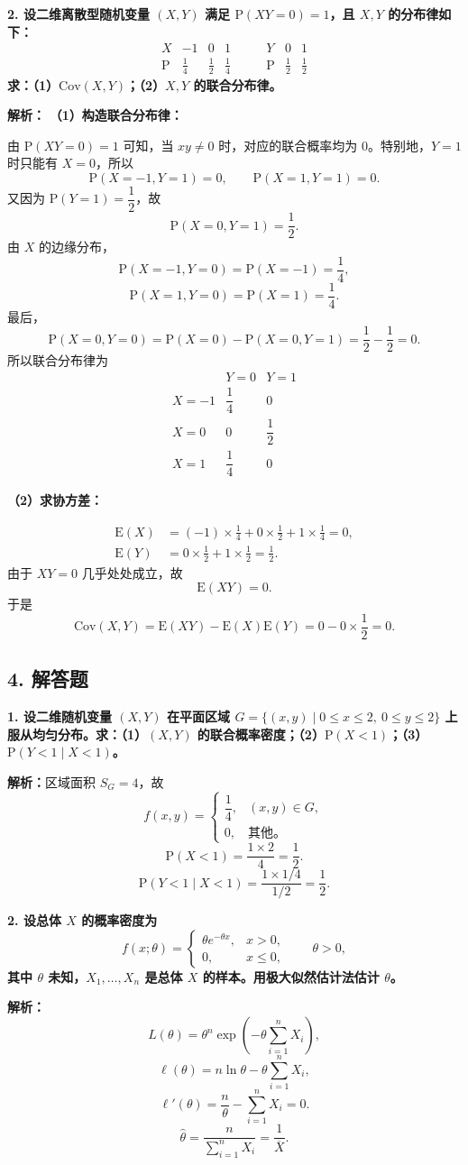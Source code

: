 ﻿\documentclass[UTF8,11pt,a4paper]{ctexart}
\newcommand{\Pp}{\mathrm{P}}
\newcommand{\E}{\mathrm{E}}
\newcommand{\Cov}{\mathrm{Cov}}
\newcommand{\Ana}[1]{\par\textbf{解析：}#1\par\medskip}
\newcommand{\Q}[1]{\par\textbf{#1}\par}
\begin{document}
\Q{2. 设二维离散型随机变量 $(X,Y)$ 满足 $\Pp(XY=0)=1$，且 $X,Y$ 的分布律如下：
\[
\begin{array}{c|ccc}X&-1&0&1\\\hline \Pp&\frac14&\frac12&\frac14\end{array}
\qquad
\begin{array}{c|cc}Y&0&1\\\hline \Pp&\frac12&\frac12\end{array}
\]
求：（1）$\Cov(X,Y)$；（2）$X,Y$ 的联合分布律。}
\Ana{
\textbf{（1）构造联合分布律：}

由 $\Pp(XY=0)=1$ 可知，当 $xy\ne0$ 时，对应的联合概率均为 $0$。特别地，$Y=1$ 时只能有 $X=0$，所以
\[
\Pp(X=-1,Y=1)=0,
\qquad
\Pp(X=1,Y=1)=0.
\]
又因为 $\Pp(Y=1)=\dfrac12$，故
\[
\Pp(X=0,Y=1)=\frac12.
\]
由 $X$ 的边缘分布，
\[
\Pp(X=-1,Y=0)=\Pp(X=-1)=\frac14,
\]
\[
\Pp(X=1,Y=0)=\Pp(X=1)=\frac14.
\]
最后，
\[
\Pp(X=0,Y=0)=\Pp(X=0)-\Pp(X=0,Y=1)=\frac12-\frac12=0.
\]
所以联合分布律为
\[
\begin{array}{c|cc}
 &Y=0&Y=1\\\hline
X=-1&\dfrac14&0\\
X=0&0&\dfrac12\\
X=1&\dfrac14&0
\end{array}
\]

\textbf{（2）求协方差：}

\[
\begin{aligned}
\E(X)&=(-1)\times\frac14+0\times\frac12+1\times\frac14=0,\\
\E(Y)&=0\times\frac12+1\times\frac12=\frac12.
\end{aligned}
\]
由于 $XY=0$ 几乎处处成立，故
\[
\E(XY)=0.
\]
于是
\[
\Cov(X,Y)=\E(XY)-\E(X)\E(Y)=0-0\times\frac12=0.
\]
}

\subsection*{4. 解答题}
\Q{1. 设二维随机变量 $(X,Y)$ 在平面区域 $G=\{(x,y)\mid0\le x\le2,\ 0\le y\le2\}$ 上服从均匀分布。求：（1）$(X,Y)$ 的联合概率密度；（2）$\Pp(X<1)$；（3）$\Pp(Y<1\mid X<1)$。}
\Ana{区域面积 $S_G=4$，故
\[
f(x,y)=\begin{cases}\dfrac14,&(x,y)\in G,\\0,&\text{其他}。\end{cases}
\]
\[
\Pp(X<1)=\frac{1\times2}{4}=\frac12.
\]
\[
\Pp(Y<1\mid X<1)=\frac{1\times1/4}{1/2}=\frac12.
\]}

\Q{2. 设总体 $X$ 的概率密度为
\[
f(x;\theta)=\begin{cases}\theta e^{-\theta x},&x>0,\\0,&x\le0,\end{cases}\qquad\theta>0,
\]
其中 $\theta$ 未知，$X_1,\ldots,X_n$ 是总体 $X$ 的样本。用极大似然估计法估计 $\theta$。}
\Ana{
\[
L(\theta)=\theta^n\exp\left(-\theta\sum_{i=1}^nX_i\right),
\]
\[
\ell(\theta)=n\ln\theta-\theta\sum_{i=1}^nX_i,
\]
\[
\ell'(\theta)=\frac n\theta-\sum_{i=1}^nX_i=0.
\]
\[
\hat\theta=\frac{n}{\sum_{i=1}^nX_i}=\frac1{\overline X}.
\]}
\end{document}
